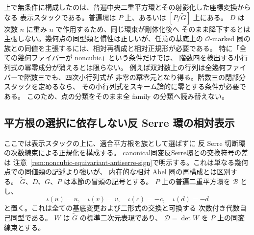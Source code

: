\begin{remark}[相対版として未証明の部分]
上で無条件に構成したのは、普遍中央二重平方環とその射影化した座標変換からなる
表示スタックである。普遍環は $P$ 上、あるいは $[P/\widetilde G]$ 上にある。
$D$ は次数 $n$ に重み $n$ で作用するため、同じ環束が剛体化後へ
そのまま降下するとは主張しない。幾何点の同型類と慣性は正しいが、任意の基底上の
$\mathcal O$-marked 圏の族との同値を主張するには、相対再構成と相対正規形が必要である。
特に「全ての幾何ファイバーが noncubic」という条件だけでは、
階数四を検出する小行列式の冪零成分が消えるとは限らない。
例えば双対数上の行列は全幾何ファイバーで階数三でも、四次小行列式が
非零の冪零元となり得る。階数三の閉部分スタックを定めるなら、
その小行列式をスキーム論的に零とする条件が必要である。
このため、点の分類をそのまま全 family の分類へ読み替えない。
\end{remark}



\subsection{平方根の選択に依存しない反 Serre 環の相対表示}
\label{subsec:noncubic-antiserre-descent}

ここでは表示スタックの上に、適合平方根を族として選ばずに
反 Serre 切断環の次数線束による正規化を構成する。
canonical同変反Serre環との交換符号の差は
注意~\ref{rem:noncubic-equivariant-antiserre-sign}で明示する。これは単なる幾何点での同値類の記述より強いが、
内在的な相対 Abel 圏の再構成とは区別する。
$\widetilde G$、$D$、$G$、$P$ は本節の冒頭の記号とする。
$P$ 上の普遍二重平方環を $\mathcal B$ とし、
\[
 \iota(u)=u,\quad \iota(v)=v,\quad
 \iota(c)=-c,\quad\iota(d)=-d
\]
と置く。これは全ての基底変更および二形式の交換と可換する
次数付き代数自己同型である。
$W$ は $\widetilde G$ の標準二次元表現であり、
$\mathcal D=\det W$ を $P$ 上の同変線束とする。

